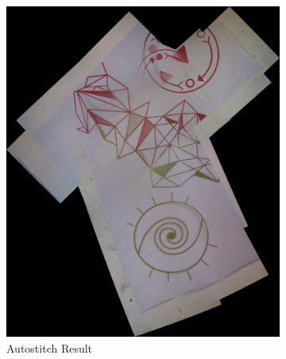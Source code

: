 \begin{figure}
\begin{subfigure}[b]{0.45\textwidth}
\includegraphics[width=\linewidth]{figures/green_red/autostich.jpg}
\caption{Autostitch Result}
\end{subfigure}
\begin{subfigure}[b]{0.45\textwidth}

\end{subfigure}
\end{figure}
